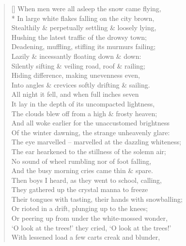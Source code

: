 \documentclass[MAIN]{subfiles}
\begin{document}
\settowidth{\versewidth}{\vin The ear hearkened to the stillness of the solemn air;}
\begin{verse}[\versewidth]
When men were all asleep the snow came flying,\\*
\vin In large white flakes falling on the city brown,\\
Stealthily \& perpetually settling \& loosely lying,\\
\vin Hushing the latest traffic of the drowsy town;\\
Deadening, muffling, stifling its murmurs failing;\\
\vin Lazily \& incessantly floating down \& down:\\
Silently sifting \& veiling road, roof \& railing;\\
\vin Hiding difference, making unevenness even,\\
Into angles \& crevices softly drifting \& sailing.\\
\vin All night it fell, and when full inches seven\\
It lay in the depth of its uncompacted lightness,\\
\vin The clouds blew off from a high \& frosty heaven;\\
And all woke earlier for the unaccustomed brightness\\
\vin Of the winter dawning, the strange unheavenly glare:\\
The eye marvelled -- marvelled at the dazzling whiteness;\\
\vin The ear hearkened to the stillness of the solemn air;\\
No sound of wheel rumbling nor of foot falling,\\
\vin And the busy morning cries came thin \& spare.\\
Then boys I heard, as they went to school, calling,\\
\vin They gathered up the crystal manna to freeze\\
Their tongues with tasting, their hands with snowballing;\\
\vin Or rioted in a drift, plunging up to the knees;\\
Or peering up from under the white-mossed wonder,\\
\vin `O look at the trees!' they cried, `O look at the trees!'\\
With lessened load a few carts creak and blunder,\\

\end{verse}
\end{document}
